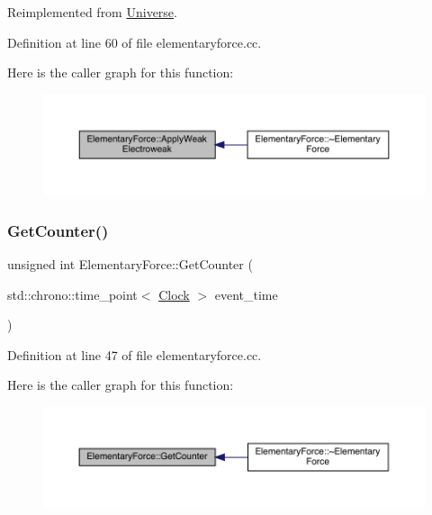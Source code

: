 Reimplemented from \hyperlink{class_universe_a46a906baabb63e5d31f8b48ea1fae52e}{Universe}.



Definition at line 60 of file elementaryforce.\+cc.

Here is the caller graph for this function\+:
\nopagebreak
\begin{figure}[H]
\begin{center}
\leavevmode
\includegraphics[width=350pt]{class_elementary_force_a2d3a5444c771f35d66d4151c62f53b12_icgraph}
\end{center}
\end{figure}
\mbox{\label{class_elementary_force_a466c37c769c1826bd0f416f38bb09996}} 
\subsubsection{\texorpdfstring{Get\+Counter()}{GetCounter()}}
{\footnotesize\ttfamily unsigned int Elementary\+Force\+::\+Get\+Counter (\begin{DoxyParamCaption}\item[{std\+::chrono\+::time\+\_\+point$<$ \hyperlink{universe_8h_a0ef8d951d1ca5ab3cfaf7ab4c7a6fd80}{Clock} $>$}]{event\+\_\+time }\end{DoxyParamCaption})}



Definition at line 47 of file elementaryforce.\+cc.

Here is the caller graph for this function\+:
\nopagebreak
\begin{figure}[H]
\begin{center}
\leavevmode
\includegraphics[width=350pt]{class_elementary_force_a466c37c769c1826bd0f416f38bb09996_icgraph}
\end{center}
\end{figure}
\mbox{\label{class_elementary_force_a2c8bc3226f42710717775c73eee1644e}} 
